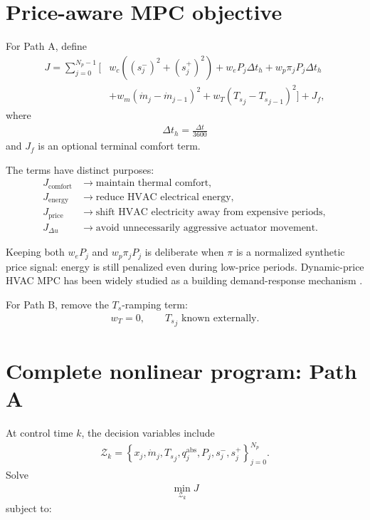 \documentclass[11pt]{article}
\newcommand{\Ts}{T_s}
\newcommand{\mdot}{\dot m}
\newcommand{\dt}{\Delta t}
\begin{document}
\section{Price-aware MPC objective}

For Path A, define
\begin{align}
J
=
\sum_{j=0}^{N_p-1}
\Big[
&
w_c
\left(
(s_j^-)^2+(s_j^+)^2
\right)
+
w_e
P_j\dt_h
+
w_p
\pi_jP_j\dt_h
\nonumber\\
&
+
w_m
(\mdot_j-\mdot_{j-1})^2
+
w_T
({\Ts}_j-{\Ts}_{j-1})^2
\Big]
+
J_f,
\tag{6.64}
\end{align}
where
\begin{align}
\dt_h=\frac{\dt}{3600}
\end{align}
and \(J_f\) is an optional terminal comfort term.

The terms have distinct purposes:
\begin{align}
J_{\mathrm{comfort}}
&\rightarrow
\text{maintain thermal comfort},
\\
J_{\mathrm{energy}}
&\rightarrow
\text{reduce HVAC electrical energy},
\\
J_{\mathrm{price}}
&\rightarrow
\text{shift HVAC electricity away from expensive periods},
\\
J_{\Delta u}
&\rightarrow
\text{avoid unnecessarily aggressive actuator movement}.
\end{align}

Keeping both \(w_eP_j\) and \(w_p\pi_jP_j\) is deliberate when \(\pi\) is a normalized synthetic
price signal: energy is still penalized even during low-price periods.  Dynamic-price HVAC MPC
has been widely studied as a building demand-response mechanism
\citep{avci2013price,amin2020price,zanetti2025flex}.

For Path B, remove the \(T_s\)-ramping term:
\begin{align}
w_T=0,
\qquad
{\Ts}_j\text{ known externally.}
\tag{6.65}
\end{align}

\section{Complete nonlinear program: Path A}

At control time \(k\), the decision variables include
\begin{align}
\mathcal Z_k
=
\left\{
x_j,\mdot_j,{\Ts}_j,
q_j^{\mathrm{abs}},P_j,s_j^-,s_j^+
\right\}_{j=0}^{N_p}.
\tag{6.66}
\end{align}
Solve
\begin{align}
\boxed{
\min_{\mathcal Z_k}J
}
\tag{6.67}
\end{align}
subject to:
\end{document}

